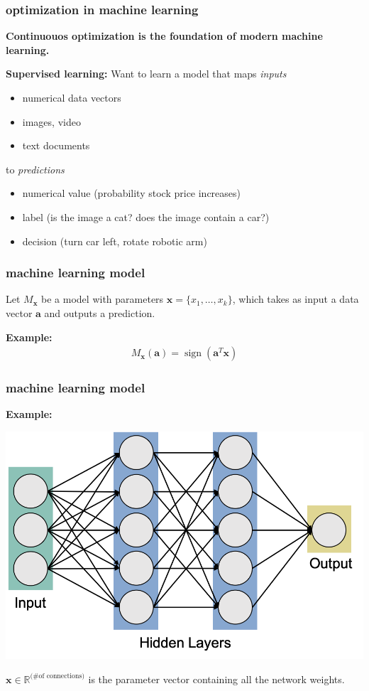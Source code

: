 \documentclass[compress]{beamer}
\newcommand{\bv}[1]{\mathbf{#1}}
\newcommand{\R}{\mathbb{R}}
\DeclareMathOperator{\sign}{sign}
\begin{document}
\begin{frame}
	\frametitle{optimization in machine learning}
	\begin{center}
		\alert{\textbf{Continuouos optimization is the foundation of modern machine learning.}}
	\end{center}
	\textbf{Supervised learning:} Want to learn a model that maps \emph{inputs}
	\begin{itemize}
		\item numerical data vectors
		\item images, video
		\item text documents
	\end{itemize} 
	
	to \emph{predictions}
	\begin{itemize}
		\item numerical value (probability stock price increases)
		\item label (is the image a cat? does the image contain a car?)
		\item decision (turn car left, rotate robotic arm)
	\end{itemize} 
\end{frame}

\begin{frame}
	\frametitle{machine learning model}
	\begin{center}
		Let $M_{\bv{x}}$ be a model with parameters $\bv{x} = \{x_1, \ldots, x_k\}$, which takes as input a data vector $\bv{a}$ and outputs a prediction.
	\end{center}
	
	\textbf{Example:}
	\begin{align*}
		M_{\bv{x}}(\bv{a}) = \sign(\bv{a}^T\bv{x})
	\end{align*}		
\end{frame}

\begin{frame}[t]
	\frametitle{machine learning model}
	\textbf{Example:}
	\begin{center}
		\includegraphics[width=.7\textwidth]{neuralNetwork.png}
	\end{center}	
	$\bv{x}\in \R^{\text{(\# of connections)}}$ is the parameter vector containing all the network weights. 	
\end{frame}
\end{document}
